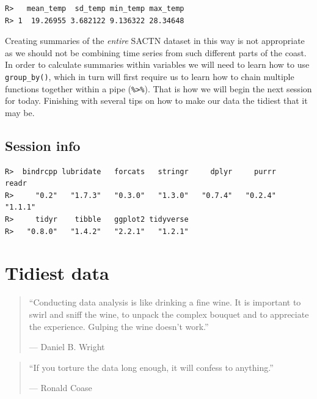 \documentclass[]{book}
\newenvironment{Shaded}{\begin{snugshade}}{\end{snugshade}}
\newcommand{\KeywordTok}[1]{\textcolor[rgb]{0.13,0.29,0.53}{\textbf{#1}}}
\newcommand{\StringTok}[1]{\textcolor[rgb]{0.31,0.60,0.02}{#1}}
\newcommand{\OperatorTok}[1]{\textcolor[rgb]{0.81,0.36,0.00}{\textbf{#1}}}
\newcommand{\NormalTok}[1]{#1}
\theoremstyle{definition}
\theoremstyle{definition}
\theoremstyle{definition}
\theoremstyle{remark}
\begin{document}
\begin{verbatim}
R>   mean_temp  sd_temp min_temp max_temp
R> 1  19.26955 3.682122 9.136322 28.34648
\end{verbatim}

Creating summaries of the \emph{entire} SACTN dataset in this way is not
appropriate as we should not be combining time series from such
different parts of the coast. In order to calculate summaries within
variables we will need to learn how to use \texttt{group\_by()}, which
in turn will first require us to learn how to chain multiple functions
together within a pipe (\texttt{\%\textgreater{}\%}). That is how we
will begin the next session for today. Finishing with several tips on
how to make our data the tidiest that it may be.

\section{Session info}\label{session-info-10}

\begin{Shaded}
\end{Shaded}

\begin{verbatim}
R>  bindrcpp lubridate   forcats   stringr     dplyr     purrr     readr 
R>     "0.2"   "1.7.3"   "0.3.0"   "1.3.0"   "0.7.4"   "0.2.4"   "1.1.1" 
R>     tidyr    tibble   ggplot2 tidyverse 
R>   "0.8.0"   "1.4.2"   "2.2.1"   "1.2.1"
\end{verbatim}

\chapter{Tidiest data}\label{tidiest}

\begin{quote}
``Conducting data analysis is like drinking a fine wine. It is important
to swirl and sniff the wine, to unpack the complex bouquet and to
appreciate the experience. Gulping the wine doesn't work.''

--- Daniel B. Wright
\end{quote}

\begin{quote}
``If you torture the data long enough, it will confess to anything.''

--- Ronald Coase
\end{quote}
\end{document}
